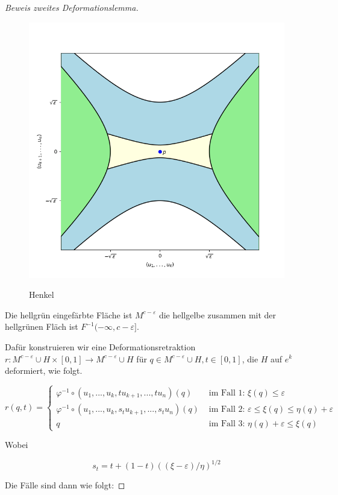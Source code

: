 \begin{proof}[Beweis zweites Deformationslemma]
    \begin{figure}[H]
        \centering
        \includegraphics[width=0.8\linewidth]{resources/Me-Diagram7-handle.png}
        \label{fig:me-diagram7}
        \caption{Henkel}
    \end{figure}

    Die hellgrün eingefärbte Fläche ist $M^{c - \varepsilon}$ die hellgelbe
    zusammen mit der hellgrünen Fläch ist $F^{-1}(-\infty, c - \varepsilon]$. 

    Dafür konstruieren wir eine Deformationsretraktion
    $r: M^{c - \varepsilon} \cup H \times [0,1] \to M^{c - \varepsilon} \cup H$
    für $q \in M^{c - \varepsilon} \cup H, t \in [0, 1]$, die $H$ auf $e^k$ 
    deformiert, wie folgt.

    \[
        r(q, t) = \begin{cases}
            \varphi^{-1} \circ (u_1, ..., u_k, tu_{k + 1}, ..., tu_n)(q)
                & \text{ im Fall 1: } \xi(q) \leq \varepsilon \\
            \varphi^{-1} \circ (u_1, ..., u_k, s_tu_{k + 1}, ..., s_tu_n)(q)
                & \text{ im Fall 2: } \varepsilon \leq \xi(q) \leq \eta(q) + \varepsilon \\
            q & \text{ im Fall 3: } \eta(q) + \varepsilon \leq \xi(q)
        \end{cases}
    \]

    Wobei 

    \[ s_t = t + (1 -t)((\xi - \varepsilon)/\eta)^{1/2} \]

    Die Fälle sind dann wie folgt:


\end{proof}
